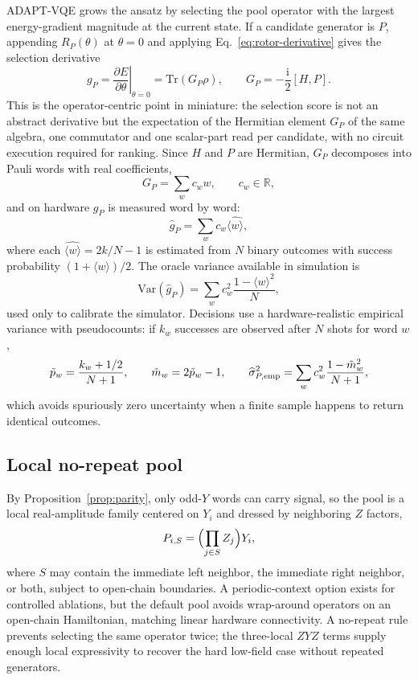 \documentclass[11pt]{article}
\newcommand{\Tr}{\mathrm{Tr}}
\newcommand{\ii}{\mathrm{i}}
\begin{document}
ADAPT-VQE grows the ansatz by selecting the pool operator with the largest energy-gradient magnitude at the current state.  If a candidate generator is $P$, appending $R_P(\theta)$ at $\theta=0$ and applying Eq.~\eqref{eq:rotor-derivative} gives the selection derivative
\begin{equation}
    g_P = \left.\frac{\partial E}{\partial\theta}\right|_{\theta=0}
    =\Tr\left(G_P\rho\right),\qquad
    G_P = -\frac{\ii}{2}[H,P].
    \label{eq:commutator-gradient}
\end{equation}
This is the operator-centric point in miniature: the selection score is not an abstract derivative but the expectation of the Hermitian element $G_P$ of the same algebra, one commutator and one scalar-part read per candidate, with no circuit execution required for ranking.  Since $H$ and $P$ are Hermitian, $G_P$ decomposes into Pauli words with real coefficients,
\begin{equation}
    G_P = \sum_w c_w w,\qquad c_w\in\mathbb{R},
\end{equation}
and on hardware $g_P$ is measured word by word:
\begin{equation}
    \widehat g_P = \sum_w c_w\widehat{\langle w\rangle},
\end{equation}
where each $\widehat{\langle w\rangle}=2k/N-1$ is estimated from $N$ binary outcomes with success probability $(1+\langle w\rangle)/2$.  The oracle variance available in simulation is
\begin{equation}
    \mathrm{Var}(\widehat g_P)=\sum_w c_w^2\frac{1-\langle w\rangle^2}{N},
    \label{eq:oracle-var}
\end{equation}
used only to calibrate the simulator.  Decisions use a hardware-realistic empirical variance with pseudocounts: if $k_w$ successes are observed after $N$ shots for word $w$,
\begin{equation}
    \tilde p_w=\frac{k_w+1/2}{N+1},\qquad
    \tilde m_w=2\tilde p_w-1,\qquad
    \widehat\sigma_{P,\rm emp}^2
    = \sum_w c_w^2\frac{1-\tilde m_w^2}{N+1},
    \label{eq:emp-var}
\end{equation}
which avoids spuriously zero uncertainty when a finite sample happens to return identical outcomes.

\subsection{Local no-repeat pool}

By Proposition~\ref{prop:parity}, only odd-$Y$ words can carry signal, so the pool is a local real-amplitude family centered on $Y_i$ and dressed by neighboring $Z$ factors,
\begin{equation}
    P_{i,S}=\Bigl(\prod_{j\in S}Z_j\Bigr)Y_i,
\end{equation}
where $S$ may contain the immediate left neighbor, the immediate right neighbor, or both, subject to open-chain boundaries.  A periodic-context option exists for controlled ablations, but the default pool avoids wrap-around operators on an open-chain Hamiltonian, matching linear hardware connectivity.  A no-repeat rule prevents selecting the same operator twice; the three-local $ZYZ$ terms supply enough local expressivity to recover the hard low-field case without repeated generators.
\end{document}

